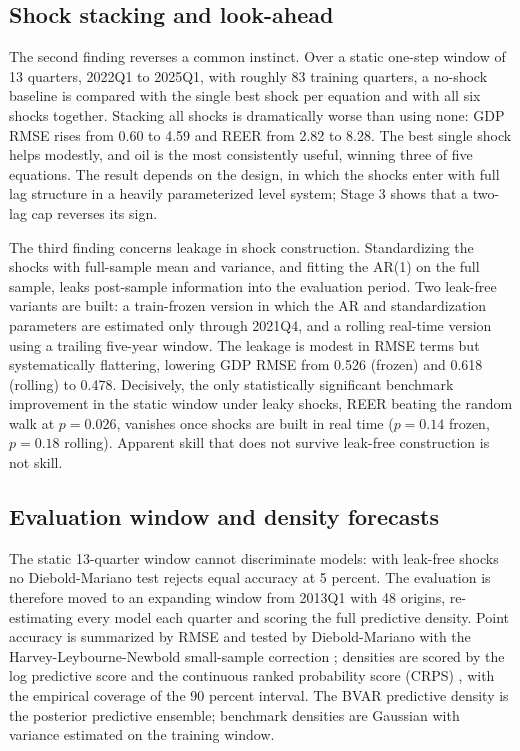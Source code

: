 \documentclass[conference]{IEEEtran}
\begin{document}
\subsection{Shock stacking and look-ahead}
The second finding reverses a common instinct. Over a static one-step window of 13 quarters, 2022Q1 to 2025Q1, with roughly 83 training quarters, a no-shock baseline is compared with the single best shock per equation and with all six shocks together. Stacking all shocks is dramatically worse than using none: GDP RMSE rises from 0.60 to 4.59 and REER from 2.82 to 8.28. The best single shock helps modestly, and oil is the most consistently useful, winning three of five equations. The result depends on the design, in which the shocks enter with full lag structure in a heavily parameterized level system; Stage 3 shows that a two-lag cap reverses its sign.

The third finding concerns leakage in shock construction. Standardizing the shocks with full-sample mean and variance, and fitting the AR(1) on the full sample, leaks post-sample information into the evaluation period. Two leak-free variants are built: a train-frozen version in which the AR and standardization parameters are estimated only through 2021Q4, and a rolling real-time version using a trailing five-year window. The leakage is modest in RMSE terms but systematically flattering, lowering GDP RMSE from 0.526 (frozen) and 0.618 (rolling) to 0.478. Decisively, the only statistically significant benchmark improvement in the static window under leaky shocks, REER beating the random walk at $p=0.026$, vanishes once shocks are built in real time ($p=0.14$ frozen, $p=0.18$ rolling). Apparent skill that does not survive leak-free construction is not skill.

\subsection{Evaluation window and density forecasts}
The static 13-quarter window cannot discriminate models: with leak-free shocks no Diebold-Mariano test rejects equal accuracy at 5 percent. The evaluation is therefore moved to an expanding window from 2013Q1 with 48 origins, re-estimating every model each quarter and scoring the full predictive density. Point accuracy is summarized by RMSE and tested by Diebold-Mariano with the Harvey-Leybourne-Newbold small-sample correction \cite{dm1995,hln1997}; densities are scored by the log predictive score and the continuous ranked probability score (CRPS) \cite{gneiting2007}, with the empirical coverage of the 90 percent interval. The BVAR predictive density is the posterior predictive ensemble; benchmark densities are Gaussian with variance estimated on the training window.
\end{document}

